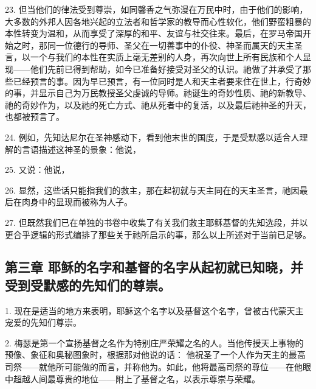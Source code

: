 23. 但当他们的律法受到尊崇，如同馨香之气弥漫在万民中时，由于他们的影响，大多数的外邦人因各地兴起的立法者和哲学家的教导而心性软化，他们野蛮粗暴的本性转变为温和，从而享受了深厚的和平、友谊与社交往来。最后，在罗马帝国开始之时，那同一位德行的导师、圣父在一切善事中的仆役、神圣而属天的天主圣言，以一个与我们的本性在实质上毫无差别的人身，再次向世上所有民族和个人显现——他们先前已得到帮助，如今已准备好接受对圣父的认识。祂做了并承受了那些已经预言的事。因为早已预言，有一位同时是人和天主者要来住在世上，行奇妙的事，并显示自己为万民教授圣父虔诚的导师。祂诞生的奇妙性质、祂的新教导、祂的奇妙作为，以及祂的死亡方式、祂从死者中的复活，以及最后祂神圣的升天，也都被预言了。\par

24. 例如，先知达尼尔在圣神感动下，看到他末世的国度，于是受默感以适合人理解的言语描述这神圣的景象：他说， \par

25. 又说：他说， \par

26. 显然，这些话只能指我们的救主，那在起初就与天主同在的天主圣言，祂因最后在肉身中的显现而被称为人子。\par

27. 但既然我们已在单独的书卷中收集了有关我们救主耶稣基督的先知选段，并以更合乎逻辑的形式编排了那些关于祂所启示的事，那么以上所述对于当前已足够。\par


\subsection{第三章  耶稣的名字和基督的名字从起初就已知晓，并受到受默感的先知们的尊崇。}

1. 现在是适当的地方来表明，耶稣这个名字以及基督这个名字，曾被古代蒙天主宠爱的先知们尊崇。\par

2. 梅瑟是第一个宣扬基督之名作为特别庄严荣耀之名的人。当他传授天上事物的预像、象征和奥秘图象时，根据那对他说的话：  他祝圣了一个人作为天主的最高司祭——就他所可能做的而言，并称他为。如此，他将最高司祭的尊位——在他眼中超越人间最尊贵的地位——附上了基督之名，以表示尊崇与荣耀。\par


